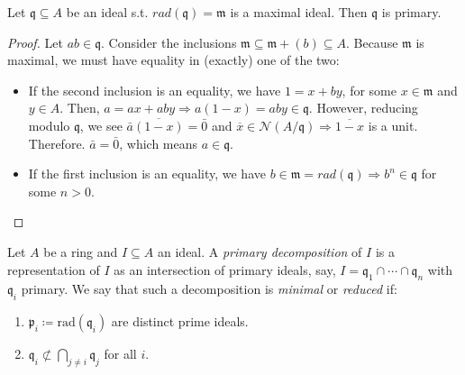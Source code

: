 \begin{prop}
    Let $\mathfrak{q} \subseteq A$ be an ideal s.t. $rad(\mathfrak{q}) = \mathfrak{m}$ is a maximal ideal.
    Then $\mathfrak{q}$ is primary.

    \begin{proof}
        Let $ab \in \mathfrak{q}$.
        Consider the inclusions $\mathfrak{m} \subseteq \mathfrak{m} + (b) \subseteq A$.
        Because $\mathfrak{m}$ is maximal, we must have equality in (exactly) one of the two:

        \begin{itemize}

            \item If the second inclusion is an equality, we have $1 = x + by$, for some $x \in \mathfrak{m}$ and $y \in A$.
            Then, $a = ax + aby \Rightarrow a(1-x) = aby \in \mathfrak{q}$.
            However, reducing modulo $\mathfrak{q}$, we see $\bar{a}\overline{(1-x)} = \bar{0}$
            and $\overline{x} \in \mathcal{N}(A/\mathfrak{q}) \Rightarrow \overline{1-x}$ is a unit.
            Therefore. $\bar{a} = \bar{0}$, which means $a \in \mathfrak{q}$.

            \item If the first inclusion is an equality, we have
            $b \in \mathfrak{m} = rad(\mathfrak{q})
            \Rightarrow b^n \in \mathfrak{q}$ for some $n > 0$.

        \end{itemize}
    \end{proof}

\end{prop}

\begin{defn}
    Let $A$ be a ring and $I \subseteq A$ an ideal.
    A \emph{primary decomposition} of $I$ is a representation of $I$ as an intersection of primary ideals,
    say, $I = \mathfrak{q}_1 \cap \cdots \cap \mathfrak{q}_n$ with $\mathfrak{q}_i$ primary.
    We say that such a decomposition is \emph{minimal} or \emph{reduced} if:

    \begin{enumerate}
        \item $\mathfrak{p}_i \coloneqq \text{rad}(\mathfrak{q}_i)$ are distinct prime ideals. \label{item:distinct-primes}
        \item $\mathfrak{q}_i \not\subset \bigcap_{j \neq i} \mathfrak{q}_j$ for all $i$. \label{item:noninclusion}
    \end{enumerate}
\end{defn}

